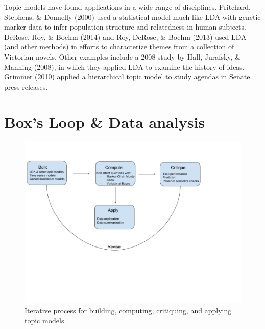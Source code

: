 \documentclass[12pt,]{article}
\begin{document}
Topic models have found applications in a wide range of disciplines.
Pritchard, Stephens, \& Donnelly (2000) used a statistical model much
like LDA with genetic marker data to infer population structure and
relatedness in human subjects. DeRose, Roy, \& Boehm (2014) and Roy,
DeRose, \& Boehm (2013) used LDA (and other methods) in efforts to
characterize themes from a collection of Victorian novels. Other
examples include a 2008 study by Hall, Jurafsky, \& Manning (2008), in
which they applied LDA to examine the history of ideas. Grimmer (2010)
applied a hierarchical topic model to study agendas in Senate press
releases.

\section{Box's Loop \& Data analysis}\label{boxs-loop-data-analysis}

\begin{figure}
\includegraphics{box-blei-loop.png}
\caption{Iterative process for building, computing, critiquing, and applying topic models.\label{fig:box}}
\end{figure}
\end{document}
